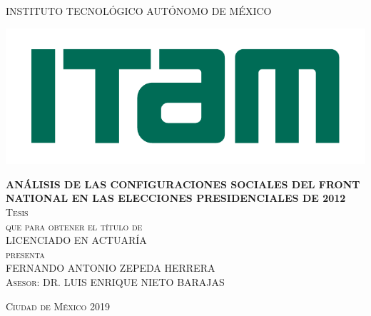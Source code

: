 \begin{titlepage}

\begin{center}

\large{INSTITUTO TECNOLÓGICO AUTÓNOMO DE MÉXICO}\\

\begin{center}
	\includegraphics[scale=0.8]{Figs/logo-ITAM.pdf}
\end{center}

\textsc{\large \textbf{ANÁLISIS DE LAS CONFIGURACIONES SOCIALES DEL FRONT NATIONAL EN LAS ELECCIONES PRESIDENCIALES DE 2012}}\\[2em]

\textsc{\large Tesis}\\[1em]

\textsc{que para obtener el título de}\\[1em]

\textsc{LICENCIADO EN ACTUARÍA}\\[1em]

\textsc{presenta}\\[1em]

\textsc{\Large FERNANDO ANTONIO ZEPEDA HERRERA}\\[1em]

\textsc{\large Asesor: DR. LUIS ENRIQUE NIETO BARAJAS}

\end{center}

\vspace*{\fill}
\textsc{Ciudad de México \hspace*{\fill} 2019}

\end{titlepage}